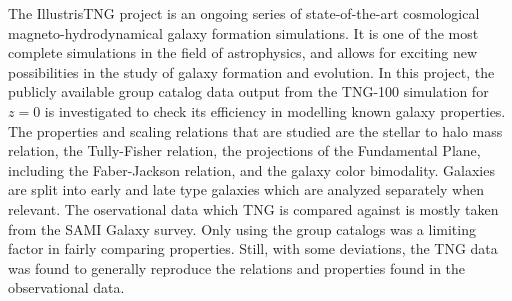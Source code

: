 The IllustrisTNG project is an ongoing series of state-of-the-art cosmological magneto-hydrodynamical galaxy formation simulations. It is one of the most complete simulations in the field of astrophysics, and allows for exciting new possibilities in the study of galaxy formation and evolution. In this project, the publicly available group catalog data output from the TNG-100 simulation for $z=0$ is investigated to check its efficiency in modelling known galaxy properties. The properties and scaling relations that are studied are the stellar to halo mass relation, the Tully-Fisher relation, the projections of the Fundamental Plane, including the Faber-Jackson relation, and the galaxy color bimodality. Galaxies are split into early and late type galaxies which are analyzed separately when relevant. The oservational data which TNG is compared against is mostly taken from the SAMI Galaxy survey. Only using the group catalogs was a limiting factor in fairly comparing properties. Still, with some deviations, the TNG data was found to generally reproduce the relations and properties found in the observational data.
